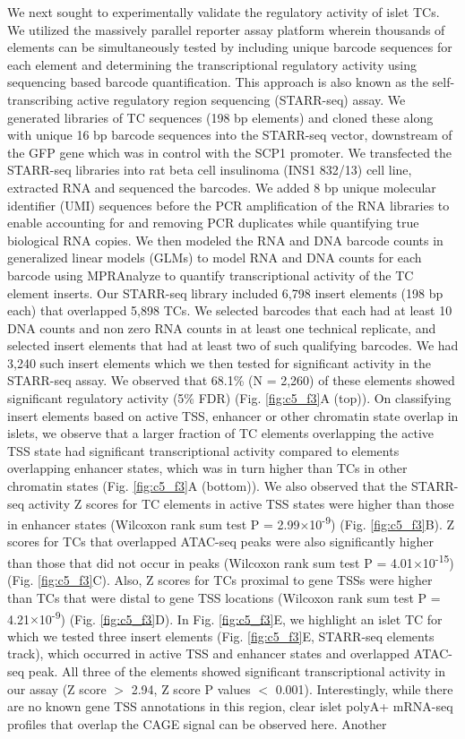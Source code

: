 We next sought to experimentally validate the regulatory activity of islet TCs. We utilized the massively parallel reporter assay platform wherein thousands of elements can be simultaneously tested by including unique barcode sequences for each element and determining the transcriptional regulatory activity using sequencing based barcode quantification. This approach is also known as the self-transcribing active regulatory region sequencing (STARR-seq) assay. We generated libraries of TC sequences (198 bp elements) and cloned these along with unique 16 bp barcode sequences into the STARR-seq vector, downstream of the GFP gene which was in control with the SCP1 promoter. We transfected the STARR-seq libraries into rat beta cell insulinoma (INS1 832/13) cell line, extracted RNA and sequenced the barcodes. We added 8 bp unique molecular identifier (UMI) sequences before the PCR amplification of the RNA libraries to enable accounting for and removing PCR duplicates while quantifying true biological RNA copies. We then modeled the RNA and DNA barcode counts in generalized linear models (GLMs) to model RNA and DNA counts for each barcode using MPRAnalyze \cite{ashuachMPRAnalyzeStatisticalFramework2019} to quantify transcriptional activity of the TC element inserts. Our STARR-seq library included 6,798 insert elements (198 bp each) that overlapped 5,898 TCs. We selected barcodes that each had at least 10 DNA counts and non zero RNA counts in at least one technical replicate, and selected insert elements that had at least two of such qualifying barcodes. We had 3,240 such insert elements which we then tested for significant activity in the STARR-seq assay. We observed that 68.1\% (N = 2,260) of these elements showed significant regulatory activity (5\% FDR) (Fig. \ref{fig:c5_f3}A (top)). On classifying insert elements based on active TSS, enhancer or other chromatin state overlap in islets, we observe that a larger fraction of TC elements overlapping the active TSS state had significant transcriptional activity compared to elements overlapping enhancer states, which was in turn higher than TCs in other chromatin states (Fig. \ref{fig:c5_f3}A (bottom)). We also observed that the STARR-seq activity Z scores for TC elements in active TSS states were higher than those in enhancer states (Wilcoxon rank sum test P = 2.99$\times$10\textsuperscript{-9}) (Fig. \ref{fig:c5_f3}B). Z scores for TCs that overlapped ATAC-seq peaks were also significantly higher than those that did not occur in peaks (Wilcoxon rank sum test P = 4.01$\times$10\textsuperscript{-15}) (Fig. \ref{fig:c5_f3}C). Also, Z scores for TCs proximal to gene TSSs were higher than TCs that were distal to gene TSS locations (Wilcoxon rank sum test P = 4.21$\times$10\textsuperscript{-9}) (Fig. \ref{fig:c5_f3}D). In Fig. \ref{fig:c5_f3}E, we highlight an islet TC for which we tested three insert elements (Fig. \ref{fig:c5_f3}E, STARR-seq elements track), which occurred in active TSS and enhancer states and overlapped ATAC-seq peak. All three of the elements showed significant transcriptional activity in our assay (Z score $>$ 2.94, Z score P values $<$ 0.001). Interestingly, while there are no known gene TSS annotations in this region, clear islet polyA+ mRNA-seq profiles that overlap the CAGE signal can be observed here. Another 